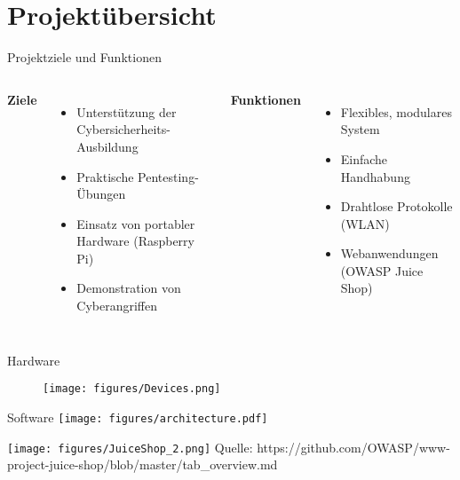 {
\section{Projektübersicht}

\begin{frame}
    \tableofcontents[currentsection]
\end{frame}

\begin{frame}{Projektziele und Funktionen}
\begin{columns}

  \textbf{Ziele}
  \begin{itemize}
    \item Unterstützung der Cybersicherheits-Ausbildung
    \item Praktische Pentesting-Übungen
    \item Einsatz von portabler Hardware (Raspberry Pi)
    \item Demonstration von Cyberangriffen
  \end{itemize}

  \textbf{Funktionen}
  \begin{itemize}
    \item Flexibles, modulares System
    \item Einfache Handhabung
    \item Drahtlose Protokolle (WLAN)
    \item Webanwendungen (OWASP Juice Shop)
  \end{itemize}
  \vspace{.7cm}
\end{columns}
\end{frame}

\begin{frame}{Hardware}
    \begin{figure}[h]
        \centering
        \texttt{[image: figures/Devices.png]}
    \end{figure}
\end{frame}

\begin{frame}{Software}
   \centering
   \texttt{[image: figures/architecture.pdf]}
\end{frame}

\begin{frame}
    \centering
    \texttt{[image: figures/JuiceShop\_2.png]}
    \fontsize{4}{4}\selectfont Quelle: https://github.com/OWASP/www-project-juice-shop/blob/master/tab\_overview.md
\end{frame}
}